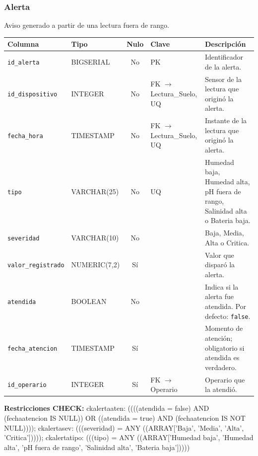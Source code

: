\documentclass[11pt,letterpaper]{article}
\newcommand{\tbus}{\textunderscore\allowbreak}
\newcommand{\tb}[1]{{\ttfamily\let\_\tbus #1}}
\begin{document}
\subsubsection*{Alerta}
Aviso generado a partir de una lectura fuera de rango.
{\footnotesize
\begin{longtable}{>{\raggedright\arraybackslash}p{3.3cm}>{\raggedright\arraybackslash}p{2.5cm}c>{\raggedright\arraybackslash}p{2.2cm}>{\raggedright\arraybackslash}p{6.1cm}}
\toprule
\textbf{Columna} & \textbf{Tipo} & \textbf{Nulo} & \textbf{Clave} & \textbf{Descripción} \\
\midrule
\endhead
\texttt{id\_alerta} & BIGSERIAL & No & PK & Identificador de la alerta. \\
\texttt{id\_dispositivo} & INTEGER & No & FK $\to$ Lectura\_Suelo, UQ & Sensor de la lectura que originó la alerta. \\
\texttt{fecha\_hora} & TIMESTAMP & No & FK $\to$ Lectura\_Suelo, UQ & Instante de la lectura que originó la alerta. \\
\texttt{tipo} & VARCHAR(25) & No & UQ & Humedad baja, Humedad alta, pH fuera de rango, Salinidad alta o Bateria baja. \\
\texttt{severidad} & VARCHAR(10) & No &  & Baja, Media, Alta o Critica. \\
\texttt{valor\_registrado} & NUMERIC(7,2) & Sí &  & Valor que disparó la alerta. \\
\texttt{atendida} & BOOLEAN & No &  & Indica si la alerta fue atendida. Por defecto: \texttt{false}. \\
\texttt{fecha\_atencion} & TIMESTAMP & Sí &  & Momento de atención; obligatorio si atendida es verdadero. \\
\texttt{id\_operario} & INTEGER & Sí & FK $\to$ Operario & Operario que la atendió. \\
\bottomrule
\end{longtable}}
{\footnotesize\raggedright\textbf{Restricciones CHECK:} \tb{ck\_alerta\_aten}: \tb{((((atendida = false) AND (fecha\_atencion IS NULL)) OR ((atendida = true) AND (fecha\_atencion IS NOT NULL))))}; \tb{ck\_alerta\_sev}: \tb{(((severidad) = ANY ((ARRAY['Baja', 'Media', 'Alta', 'Critica']))))}; \tb{ck\_alerta\_tipo}: \tb{(((tipo) = ANY ((ARRAY['Humedad baja', 'Humedad alta', 'pH fuera de rango', 'Salinidad alta', 'Bateria baja']))))}\par}
\medskip
\end{document}

